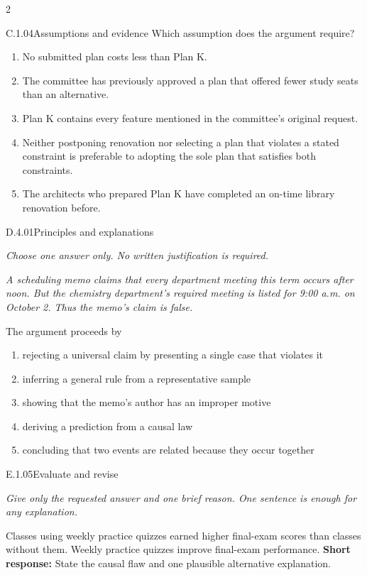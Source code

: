 \documentclass[9pt]{extarticle}
\newcommand{\choice}[1]{\item #1}
\begin{document}
\begin{multicols}{2}
\begin{DenseCoreProblem}{C.1.04}{Assumptions and evidence}
Which assumption does the argument require?
\begin{enumerate}[label=(\alph*)]
  \choice{No submitted plan costs less than Plan K.}
  \choice{The committee has previously approved a plan that offered fewer study seats than an alternative.}
  \choice{Plan K contains every feature mentioned in the committee's original request.}
  \choice{Neither postponing renovation nor selecting a plan that violates a stated constraint is preferable to adopting the sole plan that satisfies both constraints.}
  \choice{The architects who prepared Plan K have completed an on-time library renovation before.}
\end{enumerate}
\end{DenseCoreProblem}
\begin{DenseCoreProblem}{D.4.01}{Principles and explanations}
{\scriptsize\textit{Choose one answer only. No written justification is required.}\par}
\emph{A scheduling memo claims that every department meeting this term occurs after noon. But the chemistry department's required meeting is listed for 9:00 a.m. on October 2. Thus the memo's claim is false.}

The argument proceeds by
\begin{enumerate}[label=(\alph*)]
  \choice{rejecting a universal claim by presenting a single case that violates it}
  \choice{inferring a general rule from a representative sample}
  \choice{showing that the memo's author has an improper motive}
  \choice{deriving a prediction from a causal law}
  \choice{concluding that two events are related because they occur together}
\end{enumerate}
\end{DenseCoreProblem}
\begin{DenseCoreProblem}{E.1.05}{Evaluate and revise}
{\scriptsize\textit{Give only the requested answer and one brief reason. One sentence is enough for any explanation.}\par}
Classes using weekly practice quizzes earned higher final-exam scores than classes without them. Weekly practice quizzes improve final-exam performance.
\textbf{Short response:} State the causal flaw and one plausible alternative explanation.
\end{DenseCoreProblem}
\end{multicols}
\CoreWorkArea
\FormBreak
{}
\end{document}
